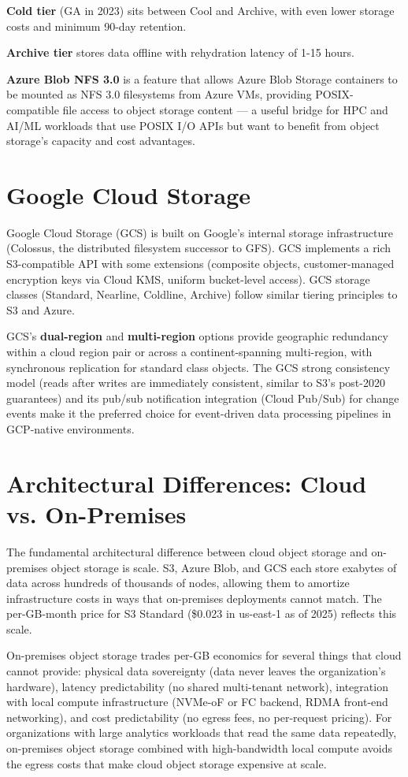 \textbf{Cold tier} (GA in 2023) sits between Cool and Archive, with even lower storage costs and minimum 90-day retention.

\textbf{Archive tier} stores data offline with rehydration latency of 1-15 hours.

\textbf{Azure Blob NFS 3.0} is a feature that allows Azure Blob Storage containers to be mounted as NFS 3.0 filesystems from Azure VMs, providing POSIX-compatible file access to object storage content --- a useful bridge for HPC and AI/ML workloads that use POSIX I/O APIs but want to benefit from object storage's capacity and cost advantages.

\section{Google Cloud Storage}
Google Cloud Storage (GCS) is built on Google's internal storage infrastructure (Colossus, the distributed filesystem successor to GFS). GCS implements a rich S3-compatible API with some extensions (composite objects, customer-managed encryption keys via Cloud KMS, uniform bucket-level access). GCS storage classes (Standard, Nearline, Coldline, Archive) follow similar tiering principles to S3 and Azure.

GCS's \textbf{dual-region} and \textbf{multi-region} options provide geographic redundancy within a cloud region pair or across a continent-spanning multi-region, with synchronous replication for standard class objects. The GCS strong consistency model (reads after writes are immediately consistent, similar to S3's post-2020 guarantees) and its pub/sub notification integration (Cloud Pub/Sub) for change events make it the preferred choice for event-driven data processing pipelines in GCP-native environments.

\section{Architectural Differences: Cloud vs. On-Premises}
The fundamental architectural difference between cloud object storage and on-premises object storage is scale. S3, Azure Blob, and GCS each store exabytes of data across hundreds of thousands of nodes, allowing them to amortize infrastructure costs in ways that on-premises deployments cannot match. The per-GB-month price for S3 Standard (\$0.023 in us-east-1 as of 2025) reflects this scale.

On-premises object storage trades per-GB economics for several things that cloud cannot provide: physical data sovereignty (data never leaves the organization's hardware), latency predictability (no shared multi-tenant network), integration with local compute infrastructure (NVMe-oF or FC backend, RDMA front-end networking), and cost predictability (no egress fees, no per-request pricing). For organizations with large analytics workloads that read the same data repeatedly, on-premises object storage combined with high-bandwidth local compute avoids the egress costs that make cloud object storage expensive at scale.

